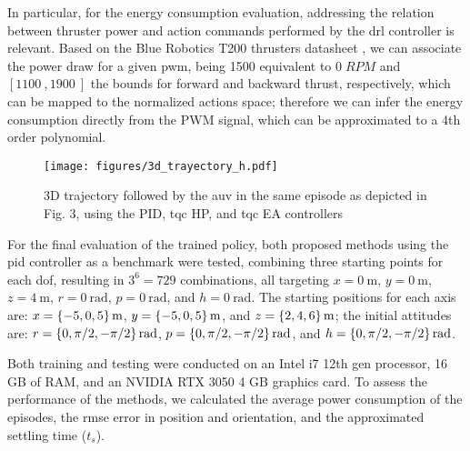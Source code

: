 In particular, for the energy consumption evaluation, addressing the relation between thruster power and action commands performed by the \ac{drl} controller is relevant. Based on the Blue Robotics T200 thrusters datasheet \cite{T200Thruster}, we can associate the power draw for a given \ac{pwm}, being \SI{1500}{} equivalent to $0 \; RPM$ and $\left[\SI{1100}{}, \SI{1900}{}\right]$ the bounds for forward and backward thrust, respectively, which can be mapped to the normalized actions space; therefore we can infer the energy consumption directly from the PWM signal, which can be approximated to a 4th order polynomial.

\begin{figure*}[t!]
\centering
\texttt{[image: figures/3d\_trayectory\_h.pdf]}%
\caption{3D trajectory followed by the \ac{auv} in the same episode as depicted in Fig. 3, using the PID, \ac{tqc} HP, and \ac{tqc} EA controllers}
\label{fig:3d_trayectory}
\end{figure*}

For the final evaluation of the trained policy, both proposed methods using the \ac{pid} controller as a benchmark were tested, combining three starting points for each \ac{dof}, resulting in $3^6 = 729$ combinations, all targeting $x = \SI{0}{\meter}$, $y = \SI{0}{\meter}$, $z = \SI{4}{\meter}$, $r = \SI{0}{\radian}$, $p = \SI{0}{\radian}$, and $h = \SI{0}{\radian}$. The starting positions for each axis are: $x = \SI[parse-numbers=false]{\{-5, 0, 5\}}{\meter}$, $y = \SI[parse-numbers=false]{\{-5, 0, 5\}}{\meter}$, and $z = \SI[parse-numbers=false]{\{2, 4, 6\}}{\meter}$; the initial attitudes are: $r = \SI[parse-numbers=false]{\{0, \pi/2, -\pi/2\}}{\radian}$, $p = \SI[parse-numbers=false]{\{0, \pi/2, -\pi/2\}}{\radian}$, and $h = \SI[parse-numbers=false]{\{0, \pi/2, -\pi/2\}}{\radian}$.

Both training and testing were conducted on an Intel i7 12th gen processor, 16 GB of RAM, and an NVIDIA RTX 3050 4 GB graphics card. To assess the performance of the methods, we calculated the average power consumption of the episodes, the \ac{rmse} error in position and orientation, and the approximated settling time ($t_s$).

